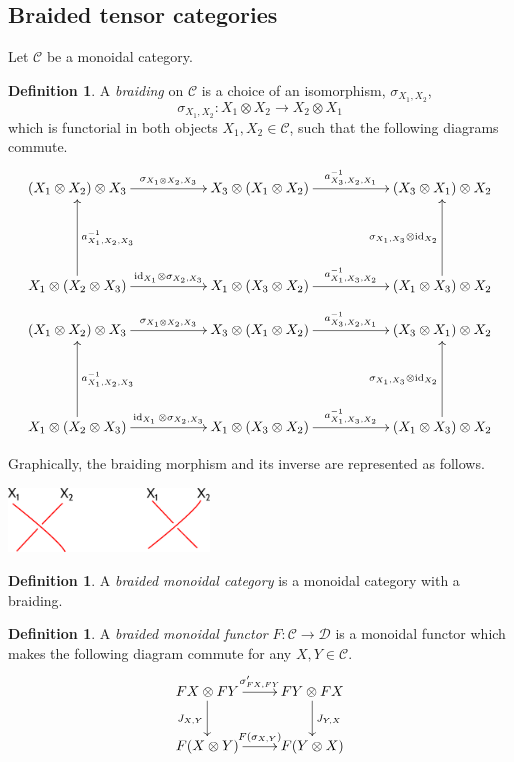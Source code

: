 \documentclass[a4paper, 10pt]{book}
\theoremstyle{definition}
\newtheorem{Def}[theorem]{Definition}
\numberwithin{equation}{chapter}
\newcommand\inv{^{-1}}
\newcommand\id{\operatorname{id}}
\newcommand\C{\mathcal C}
\newcommand\D{\mathcal D}
\newcommand{\ra}\rightarrow
\begin{document}
\subsection{Braided tensor categories}
Let $\C$ be a monoidal category. 

\begin{Def}
A \textit{braiding} on $\C$ is a choice of an isomorphism, $\sigma_{X_1, X_2}$,
\begin{equation}
	\sigma_{X_1, X_2} : X_1\otimes X_2 \rightarrow X_2 \otimes X_1
\end{equation}
which is functorial in both objects $X_1, X_2\in \C$, such that the following diagrams commute.
 \begin{align} \label{hex}
\xymatrix { (X_1\otimes X_2)\otimes X_3 \ar[rr]^{\sigma_{X_1\otimes X_2, X_3}}  & & X_3  \otimes(X_1\otimes X_2)\ar[rr]^{a\inv_{X_3,X_2,X_1}}&& (X_3\otimes X_1)\otimes X_2 \\
\\
X_1\otimes (X_2\otimes X_3) \ar[uu]_{a\inv_{X_1, X_2, X_3}}\ar[rr]^{\text{id}_{X_1}\otimes \sigma_{X_2, X_3} }&& X_1\otimes (X_3\otimes X_2) \ar[rr]^{a\inv_{X_1, X_3,X_2}} && (X_1\otimes X_3)\otimes X_2 \ar[uu]^{\sigma_{X_1,X_3}\otimes \id_{X_2}} }
\end{align}
\begin{align} 
\xymatrix { (X_1\otimes X_2)\otimes X_3 \ar[rr]^{\sigma_{X_1\otimes X_2, X_3}}  & & X_3  \otimes(X_1\otimes X_2)\ar[rr]^{a\inv_{X_3,X_2,X_1}}&& (X_3\otimes X_1)\otimes X_2 \\
\\
X_1\otimes (X_2\otimes X_3) \ar[uu]_{a\inv_{X_1, X_2, X_3}}\ar[rr]^{\id_{X_1}\otimes \sigma_{X_2, X_3} }&& X_1\otimes (X_3\otimes X_2) \ar[rr]^{a\inv_{X_1, X_3,X_2}} && (X_1\otimes X_3)\otimes X_2 \ar[uu]^{\sigma_{X_1,X_3}\otimes \id_{X_2}} }\label{hex2}
\end{align}

\end{Def}
Graphically, the braiding morphism and its inverse are represented as follows. 
\begin{center}
\includegraphics[width=0.4\textwidth]{braiding.eps}
\end{center}
\begin{Def}

A \textit{braided monoidal category} is a monoidal category with a braiding.

\end{Def}
\begin{Def}
A \textit{braided monoidal functor} $F:\C\ra\D$ is a monoidal functor which makes the following diagram commute for any $X, Y \in \C$.
\[
\xymatrix{FX \otimes FY \ar[r]^{\sigma'_{FX, FY}} \ar[d]_{J_{X, Y}} & FY \otimes FX \ar[d]^{J_{Y,X}}\\
F(X\otimes Y) \ar[r]^{F(\sigma_{X, Y})} & F(Y\otimes X)}
\]
\end{Def}
\end{document}
